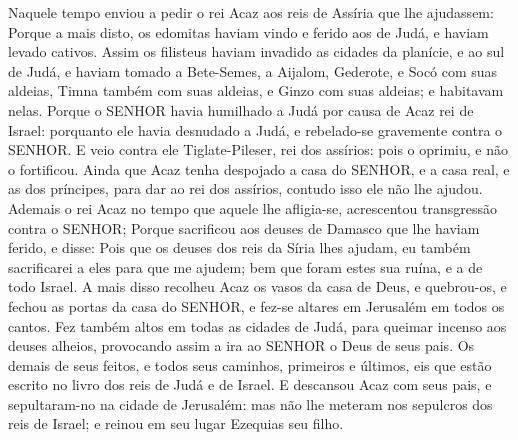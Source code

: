 {Naquele tempo enviou a pedir o rei Acaz aos reis de Assíria que lhe ajudassem:
Porque a mais disto, os edomitas haviam vindo e ferido aos de Judá, e haviam levado cativos.
Assim os filisteus haviam invadido as cidades da planície, e ao sul de Judá, e haviam tomado a Bete-Semes, a Aijalom, Gederote, e Socó com suas aldeias, Timna também com suas aldeias, e Ginzo com suas aldeias; e habitavam nelas.
Porque o SENHOR havia humilhado a Judá por causa de Acaz rei de Israel: porquanto ele havia desnudado a Judá, e rebelado-se gravemente contra o SENHOR.
E veio contra ele Tiglate-Pileser, rei dos assírios: pois o oprimiu, e não o fortificou.
Ainda que Acaz tenha despojado a casa do SENHOR, e a casa real, e as dos príncipes, para dar ao rei dos assírios, contudo isso ele não lhe ajudou.
Ademais o rei Acaz no tempo que aquele lhe afligia-se, acrescentou transgressão contra o SENHOR;
Porque sacrificou aos deuses de Damasco que lhe haviam ferido, e disse: Pois que os deuses dos reis da Síria lhes ajudam, eu também sacrificarei a eles para que me ajudem; bem que foram estes sua ruína, e a de todo Israel.
A mais disso recolheu Acaz os vasos da casa de Deus, e quebrou-os, e fechou as portas da casa do SENHOR, e fez-se altares em Jerusalém em todos os cantos.
Fez também altos em todas as cidades de Judá, para queimar incenso aos deuses alheios, provocando assim a ira ao SENHOR o Deus de seus pais.
Os demais de seus feitos, e todos seus caminhos, primeiros e últimos, eis que estão escrito no livro dos reis de Judá e de Israel.
E descansou Acaz com seus pais, e sepultaram-no na cidade de Jerusalém: mas não lhe meteram nos sepulcros dos reis de Israel; e reinou em seu lugar Ezequias seu filho.

}
